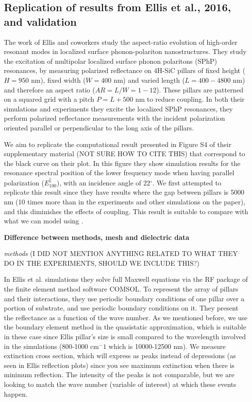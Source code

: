  \subsection{Replication of results from Ellis et al., 2016, and validation}

The work of Ellis and coworkers \cite{ellis2016} study the aspect-ratio evolution of high-order
resonant modes in localized surface phonon-polariton nanostructures. They study the
excitation of multipolar localized surface phonon polaritons (SPhP) resonances, by measuring
polarized reflectance on 4H-SiC pillars of fixed height ($H=950$ nm), fixed 
width ($W=400$ nm) and varied length ($L=400-4800$ nm) and therefore an aspect ratio
($AR=L/W=1-12$). These pillars are patterned on a squared grid with a pitch $P=L+500$ nm
to reduce coupling. In  both their simulations and experiments they excite the localized SPhP
resonances, they perform polarized reflectance measurements with the incident polarization 
oriented parallel or perpendicular to the long axis of the pillars.  

We aim to replicate the computational result presented in Figure S4 of their supplementary 
material (NOT SURE HOW TO CITE THIS) that correspond to the black curve on their plot. In this 
figure they show simulation results for the resonance spectral position of the lower frequency 
mode when having parallel polarization ($E^{\parallel}_{100}$), with an incidence angle of 22$^\circ$.
We first attempted to replicate this result since they have results where the gap between pillars 
is 5000 nm (10 times more than in the experiments and other simulations on the paper), and 
this diminishes the effects of coupling. This result is suitable to compare with 
what we can model using \pygbe.  


\textbf{Difference between methods, mesh and dielectric data}

\textit{methods}
(I DID NOT MENTION ANYTHING RELATED TO WHAT THEY DO IN THE EXPERIMENTS, SHOULD WE INCLUDE THIS?)

In Ellis et al. simulations they solve full Maxwell equations via the RF package of the finite
element method software COMSOL. To represent the array of pillars and their interactions, they use
periodic boundary conditions of one pillar over a portion of substrate, and use periodic boundary conditions on it.
They present the reflectance as a function of the wave number. 
As we mentioned before, we use the boundary element method in 
the quasistatic approximation, which is suitable in these case since Ellis pillar's size is small 
compared to the wavelength involved in the simulations (800-1000 cm$^-1$ which is 10000-12500 nm). We measure 
extinction cross section, which will express as peaks instead of depressions (as seen in Ellis reflection plots)
since you see maximum extinction when there is minimum reflection. The intensity of the peaks is not comparable, but we are 
looking to match the wave number (variable of interest) at which these events happen. 

